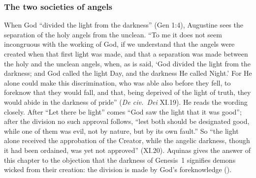 \subsubsection{The two societies of angels}\label{sec:aug-societies}

When God ``divided the light from the darkness'' (Gen 1:4), Augustine sees
the separation of the holy angels from the unclean. ``To me it does not
seem incongruous with the working of God, if we understand that the angels
were created when that first light was made, and that a separation was
made between the holy and the unclean angels, when, as is said, `God
divided the light from the darkness; and God called the light Day, and
the darkness He called Night.' For He alone could make this
discrimination, who was able also before they fell, to foreknow that they
would fall, and that, being deprived of the light of truth, they would
abide in the darkness of pride'' (\emph{De civ.\ Dei} XI.19). He reads
the wording closely. After ``Let there be light'' comes ``God saw the
light that it was good''; after the division no such approval follows,
``lest both should be designated good, while one of them was evil, not by
nature, but by its own fault.'' So ``the light alone received the
approbation of the Creator, while the angelic darkness, though it had
been ordained, was yet not approved'' (XI.20). Aquinas gives the answer of
this chapter to the objection that the darkness of Genesis~1 signifies
demons wicked from their creation: the division is made by God's
foreknowledge ().

